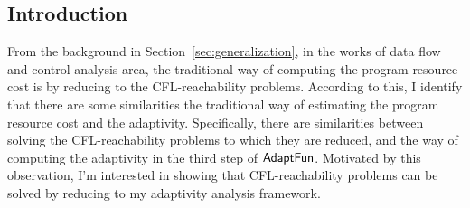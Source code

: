 \subsection{Introduction}
\label{subsec:cfl-backgroung}
From the background in Section~\ref{sec:generalization},
in the works of data flow and control analysis area,
the traditional way of computing the program resource cost is
by reducing to the CFL-reachability problems.
%
According to this, 
I identify 
that there are some similarities the traditional way of estimating the program resource cost and 
the adaptivity.
Specifically, there are similarities between solving the CFL-reachability problems to which they are reduced,
 and the way of computing the adaptivity in 
the third step of $\textsf{AdaptFun}$.
 Motivated by this observation, 
 I'm interested in showing that
 CFL-reachability problems can be solved by reducing to my adaptivity analysis framework.

